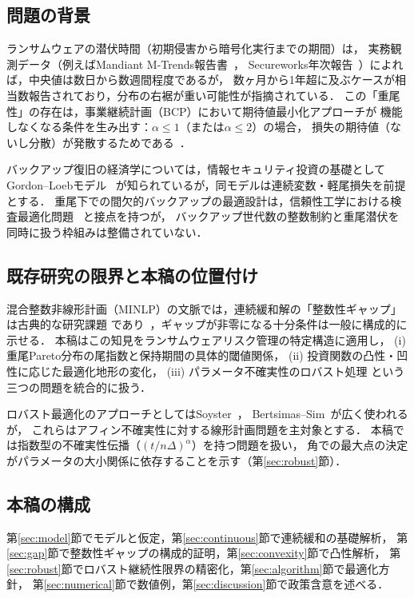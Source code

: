 \documentclass[12pt,a4paper]{article}
\theoremstyle{plain}
\theoremstyle{definition}
\theoremstyle{remark}
\begin{document}
\subsection{問題の背景}

ランサムウェアの潜伏時間（初期侵害から暗号化実行までの期間）は，
実務観測データ（例えばMandiant M-Trends報告書~\cite{mandiant2023}，
Secureworks年次報告~\cite{secureworks2023}）によれば，中央値は数日から数週間程度であるが，
数ヶ月から1年超に及ぶケースが相当数報告されており，分布の右裾が重い可能性が指摘されている．
この「重尾性」の存在は，事業継続計画（BCP）において期待値最小化アプローチが
機能しなくなる条件を生み出す：$\alpha \le 1$（または$\alpha \le 2$）の場合，
損失の期待値（ないし分散）が発散するためである~\cite{embrechts1997modelling}．

バックアップ復旧の経済学については，情報セキュリティ投資の基礎としてGordon–Loebモデル
~\cite{gordon2002economics}が知られているが，同モデルは連続変数・軽尾損失を前提とする．
重尾下での間欠的バックアップの最適設計は，信頼性工学における検査最適化問題
~\cite{barlow1965mathematical,nakagawa2005maintenance}と接点を持つが，
バックアップ世代数の整数制約と重尾潜伏を同時に扱う枠組みは整備されていない．

\subsection{既存研究の限界と本稿の位置付け}

混合整数非線形計画（MINLP）の文脈では，連続緩和解の「整数性ギャップ」は古典的な研究課題
であり~\cite{nemhauser1988integer}，ギャップが非零になる十分条件は一般に構成的に示せる．
本稿はこの知見をランサムウェアリスク管理の特定構造に適用し，
(i) 重尾Pareto分布の尾指数と保持期間の具体的閾値関係，
(ii) 投資関数の凸性・凹性に応じた最適化地形の変化，
(iii) パラメータ不確実性のロバスト処理
という三つの問題を統合的に扱う．

ロバスト最適化のアプローチとしてはSoyster~\cite{soyster1973technical}，
Bertsimas–Sim~\cite{bertsimas2004price}が広く使われるが，
これらはアフィン不確実性に対する線形計画問題を主対象とする．
本稿では指数型の不確実性伝播（$(t/n\Delta)^\alpha$）を持つ問題を扱い，
角での最大点の決定がパラメータの大小関係に依存することを示す（第\ref{sec:robust}節）．

\subsection{本稿の構成}

第\ref{sec:model}節でモデルと仮定，第\ref{sec:continuous}節で連続緩和の基礎解析，
第\ref{sec:gap}節で整数性ギャップの構成的証明，第\ref{sec:convexity}節で凸性解析，
第\ref{sec:robust}節でロバスト継続性限界の精密化，第\ref{sec:algorithm}節で最適化方針，
第\ref{sec:numerical}節で数値例，第\ref{sec:discussion}節で政策含意を述べる．
\end{document}
